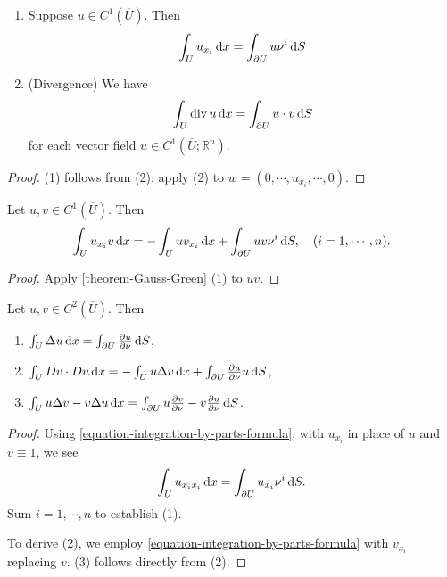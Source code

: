 \begin{theorem}
  \label{theorem-Gauss-Green}
  \begin{enumerate}
    \item Suppose \( u \in C^1(\overline{U}) \). Then
      \[
        \int_{U} u_{x_i}\mathop{}\!\mathrm{d} x = \int_{\partial U} u \nu^i \mathop{}\!\mathrm{d} S
      \]
    \item(Divergence) We have
      \[
        \int_U \operatorname{div} u \mathop{}\!\mathrm{d} x = \int_{\partial U} u \cdot v \mathop{}\!\mathrm{d} S
      \]
      for each vector field \( u \in C^1(\overline{U}; \mathbb{R}^n) \).
  \end{enumerate}
\end{theorem}
\begin{proof}
  (1) follows from (2): apply (2) to \( w = (0, \cdots, u_{x_i}, \cdots, 0) \).
\end{proof}

\begin{theorem}
  \label{theorem-integration-by-parts-formula}
  Let \( u, v \in C^1(\overline{U}) \).
  Then
  \begin{equation}
    \int_{U}u_{x_i} v \mathop{}\!\mathrm{d} x = - \int_{U} u v_{x_i} \mathop{}\!\mathrm{d} x + \int_{\partial U} uv \nu^i \mathop{}\!\mathrm{d} S,\quad (i = 1, \cdots, n).
  \label{equation-integration-by-parts-formula}
  \end{equation}
\end{theorem}
\begin{proof}
  Apply \ref{theorem-Gauss-Green} (1) to \( uv \).
\end{proof}

\begin{theorem}[Green]
  Let \( u, v \in C^2(\overline{U}) \).
  Then
  \begin{enumerate}
    \item \( \int_U \Delta u \mathop{}\!\mathrm{d} x = \int_{\partial U} \frac{\partial u}{\partial \nu} \mathop{}\!\mathrm{d} S \),
    \item \( \int_U D v \cdot Du \mathop{}\!\mathrm{d} x = - \int_U u \Delta v \mathop{}\!\mathrm{d} x + \int_{\partial U} \frac{\partial u}{\partial \nu} u \mathop{}\!\mathrm{d} S \),
    \item \( \int_U u \Delta v - v \Delta u \mathop{}\!\mathrm{d} x = \int_{\partial U} u \frac{\partial v}{\partial \nu} - v \frac{\partial u}{\partial \nu} \mathop{}\!\mathrm{d} S \).
  \end{enumerate}
\end{theorem}
\begin{proof}
  Using \eqref{equation-integration-by-parts-formula}, with \( u_{x_i} \) in place of \( u \) and \( v \equiv 1 \), we see
  \[
    \int_U u_{x_i x_i} \mathop{}\!\mathrm{d} x = \int_{\partial U} u_{x_i} \nu^i \mathop{}\!\mathrm{d} S.
  \]
  Sum \( i = 1, \cdots, n \) to establish (1).

  To derive (2), we employ \eqref{equation-integration-by-parts-formula} with \( v_{x_i} \) replacing \( v \).
  (3) follows directly from (2).
\end{proof}

